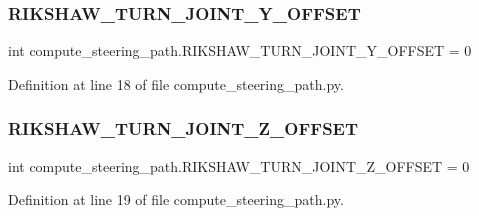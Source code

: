 \subsubsection{\texorpdfstring{RIKSHAW\_TURN\_JOINT\_Y\_OFFSET}{RIKSHAW\_TURN\_JOINT\_Y\_OFFSET}}
{\footnotesize\ttfamily int compute\+\_\+steering\+\_\+path.\+R\+I\+K\+S\+H\+A\+W\+\_\+\+T\+U\+R\+N\+\_\+\+J\+O\+I\+N\+T\+\_\+\+Y\+\_\+\+O\+F\+F\+S\+ET = 0}



Definition at line 18 of file compute\+\_\+steering\+\_\+path.\+py.

\mbox{\label{namespacecompute__steering__path_aa57a41d7e87ace0fb1989333822c4a5c}} 
\subsubsection{\texorpdfstring{RIKSHAW\_TURN\_JOINT\_Z\_OFFSET}{RIKSHAW\_TURN\_JOINT\_Z\_OFFSET}}
{\footnotesize\ttfamily int compute\+\_\+steering\+\_\+path.\+R\+I\+K\+S\+H\+A\+W\+\_\+\+T\+U\+R\+N\+\_\+\+J\+O\+I\+N\+T\+\_\+\+Z\+\_\+\+O\+F\+F\+S\+ET = 0}



Definition at line 19 of file compute\+\_\+steering\+\_\+path.\+py.

